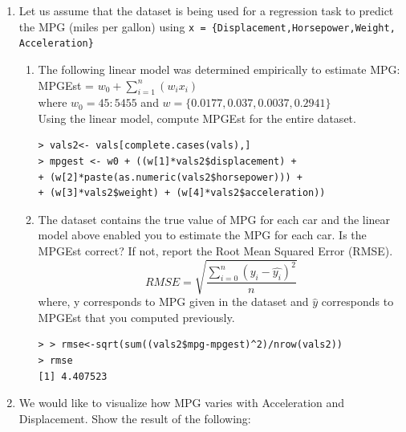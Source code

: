 \documentclass[fontsize=10pt]{scrartcl}
\begin{document}
\begin{enumerate}
		
		\item
		Let us assume that the dataset is being used for a regression task to predict the MPG (miles per gallon) using \texttt{x = \{Displacement,Horsepower,Weight, Acceleration\}} \\
		\begin{enumerate}
			\item
			The following linear model was determined empirically to estimate MPG: \\
			MPGEst = $w_0 + \sum_{i=1}^{n}(w_{i}x_{i})$ \\
			where $w_{0} = 45:5455$ and $w = \{0.0177,0.037,0.0037,0.2941\}$ \\
			Using the linear model, compute MPGEst for the entire dataset. \\
\begin{verbatim}
> vals2<- vals[complete.cases(vals),]
> mpgest <- w0 + ((w[1]*vals2$displacement) + 
+ (w[2]*paste(as.numeric(vals2$horsepower))) + 
+ (w[3]*vals2$weight) + (w[4]*vals2$acceleration))
\end{verbatim}
			
			\item
			The dataset contains the true value of MPG for each car and the linear model above enabled you to estimate the MPG for each car. Is the MPGEst correct? If not, report the Root Mean Squared Error (RMSE). \\
			\begin{equation}
				RMSE = \sqrt{\frac{\sum_{i=0}^{n}(y_{i} - \hat{y_{i}})^2}{n}}
			\end{equation}
			where, y corresponds to MPG given in the dataset and $\hat{y}$ corresponds to MPGEst that you computed previously. \\
\begin{verbatim}
> > rmse<-sqrt(sum((vals2$mpg-mpgest)^2)/nrow(vals2))
> rmse
[1] 4.407523
\end{verbatim}
		\end{enumerate}

		\item
		We would like to visualize how MPG varies with Acceleration and Displacement. Show the result of the following: \\


\end{enumerate}
\end{document}
